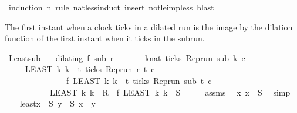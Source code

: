 \begin{isabellebody}
\isamarkupfalse%
\ {\isacharparenleft}induction\ n\ rule{\isacharcolon}\ nat{\isacharunderscore}less{\isacharunderscore}induct{\isacharcomma}\ insert\ not{\isacharunderscore}le{\isacharunderscore}imp{\isacharunderscore}less{\isacharcomma}\ blast{\isacharparenright}%
\endisatagproof
{\isafoldproof}%
%
\isadelimproof
%
\endisadelimproof
%
\begin{isamarkuptext}%
The first instant when a clock ticks in a dilated run is the image by the dilation
  function of the first instant when it ticks in the subrun.%
\end{isamarkuptext}\isamarkuptrue%
\isamarkupfalse%
\ Least{\isacharunderscore}sub{\isacharcolon}\isanewline
\ \ \ {\isacartoucheopen}dilating\ f\ sub\ r{\isacartoucheclose}\isanewline
\ \ \ \ \ \ \ {\isacartoucheopen}{\isasymexists}k{\isacharcolon}{\isacharcolon}nat{\isachardot}\ ticks\ {\isacharparenleft}{\isacharparenleft}Rep{\isacharunderscore}run\ sub{\isacharparenright}\ k\ c{\isacharparenright}{\isacartoucheclose}\isanewline
\ \ \ \ \ {\isacartoucheopen}{\isacharparenleft}LEAST\ k{\isachardot}\ k\ {\isasymin}\ {\isacharbraceleft}t{\isachardot}\ ticks\ {\isacharparenleft}{\isacharparenleft}Rep{\isacharunderscore}run\ r{\isacharparenright}\ t\ c{\isacharparenright}{\isacharbraceright}{\isacharparenright}\isanewline
\ \ \ \ \ \ \ \ \ \ \ \ \ \ {\isacharequal}\ f\ {\isacharparenleft}LEAST\ k{\isachardot}\ k\ {\isasymin}\ {\isacharbraceleft}t{\isachardot}\ ticks\ {\isacharparenleft}{\isacharparenleft}Rep{\isacharunderscore}run\ sub{\isacharparenright}\ t\ c{\isacharparenright}{\isacharbraceright}{\isacharparenright}{\isacartoucheclose}\isanewline
\ \ \ \ \ \ \ \ \ \ {\isacharparenleft}\ {\isacartoucheopen}{\isacharparenleft}LEAST\ k{\isachardot}\ k\ {\isasymin}\ {\isacharquery}R{\isacharparenright}\ {\isacharequal}\ f\ {\isacharparenleft}LEAST\ k{\isachardot}\ k\ {\isasymin}\ {\isacharquery}S{\isacharparenright}{\isacartoucheclose}{\isacharparenright}\isanewline
%
\isadelimproof
%
\endisadelimproof
%
\isatagproof
{}\isamarkupfalse%
\ {\isacharminus}\isanewline
\ \ \isamarkupfalse%
\ assms{\isacharparenleft}{}{\isacharparenright}\ \isamarkupfalse%
\ {\isacartoucheopen}{\isasymexists}x{\isachardot}\ x\ {\isasymin}\ {\isacharquery}S{\isacartoucheclose}\ \isamarkupfalse%
\ simp\isanewline
\ \ \isamarkupfalse%
\ least{\isacharcolon}{\isacartoucheopen}{\isasymexists}x\ {\isasymin}\ {\isacharquery}S{\isachardot}\ {\isasymforall}y\ {\isasymin}\ {\isacharquery}S{\isachardot}\ x\ {\isasymle}\ y{\isacartoucheclose}\isanewline

\end{isabellebody}
